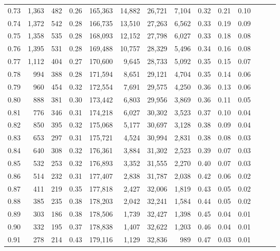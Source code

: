 \begin{tabular}{rrrrrrrrrrrrrr}
0.73 &  1,363 &  482 &  0.26 &  165,363 &   14,882 &  26,721 &   7,104 &  0.32 &  0.21 &      0.10 \\
0.74 &  1,372 &  542 &  0.28 &  166,735 &   13,510 &  27,263 &   6,562 &  0.33 &  0.19 &      0.09 \\
0.75 &  1,358 &  535 &  0.28 &  168,093 &   12,152 &  27,798 &   6,027 &  0.33 &  0.18 &      0.08 \\
0.76 &  1,395 &  531 &  0.28 &  169,488 &   10,757 &  28,329 &   5,496 &  0.34 &  0.16 &      0.08 \\
0.77 &  1,112 &  404 &  0.27 &  170,600 &    9,645 &  28,733 &   5,092 &  0.35 &  0.15 &      0.07 \\
0.78 &    994 &  388 &  0.28 &  171,594 &    8,651 &  29,121 &   4,704 &  0.35 &  0.14 &      0.06 \\
0.79 &    960 &  454 &  0.32 &  172,554 &    7,691 &  29,575 &   4,250 &  0.36 &  0.13 &      0.06 \\
0.80 &    888 &  381 &  0.30 &  173,442 &    6,803 &  29,956 &   3,869 &  0.36 &  0.11 &      0.05 \\
0.81 &    776 &  346 &  0.31 &  174,218 &    6,027 &  30,302 &   3,523 &  0.37 &  0.10 &      0.04 \\
0.82 &    850 &  395 &  0.32 &  175,068 &    5,177 &  30,697 &   3,128 &  0.38 &  0.09 &      0.04 \\
0.83 &    653 &  297 &  0.31 &  175,721 &    4,524 &  30,994 &   2,831 &  0.38 &  0.08 &      0.03 \\
0.84 &    640 &  308 &  0.32 &  176,361 &    3,884 &  31,302 &   2,523 &  0.39 &  0.07 &      0.03 \\
0.85 &    532 &  253 &  0.32 &  176,893 &    3,352 &  31,555 &   2,270 &  0.40 &  0.07 &      0.03 \\
0.86 &    514 &  232 &  0.31 &  177,407 &    2,838 &  31,787 &   2,038 &  0.42 &  0.06 &      0.02 \\
0.87 &    411 &  219 &  0.35 &  177,818 &    2,427 &  32,006 &   1,819 &  0.43 &  0.05 &      0.02 \\
0.88 &    385 &  235 &  0.38 &  178,203 &    2,042 &  32,241 &   1,584 &  0.44 &  0.05 &      0.02 \\
0.89 &    303 &  186 &  0.38 &  178,506 &    1,739 &  32,427 &   1,398 &  0.45 &  0.04 &      0.01 \\
0.90 &    332 &  195 &  0.37 &  178,838 &    1,407 &  32,622 &   1,203 &  0.46 &  0.04 &      0.01 \\
0.91 &    278 &  214 &  0.43 &  179,116 &    1,129 &  32,836 &     989 &  0.47 &  0.03 &      0.01 \\

\end{tabular}
